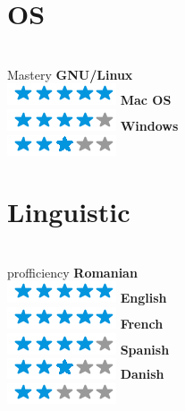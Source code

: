 \documentclass[]{friggeri-cv}
\begin{document}
\begin{aside}
  \section{OS}\\{Mastery}
    \textbf{GNU/Linux}\\ \includegraphics[scale=0.30]{img/5stars.png}
    \textbf{Mac OS}\\\includegraphics[scale=0.30]{img/4stars.png}
    \textbf{Windows}\\ \includegraphics[scale=0.30]{img/3stars.png}
    ~
  
  \section{Linguistic}\\{profficiency}
    \textbf{Romanian}\\ \includegraphics[scale=0.30]{img/5stars.png}
    \textbf{English}\\ \includegraphics[scale=0.30]{img/5stars.png}
    \textbf{French}\\ \includegraphics[scale=0.30]{img/4stars.png}
    \textbf{Spanish}\\ \includegraphics[scale=0.30]{img/3stars.png}
    \textbf{Danish}\\ \includegraphics[scale=0.30]{img/2stars.png}
    ~
    
\end{aside}
\end{document}
